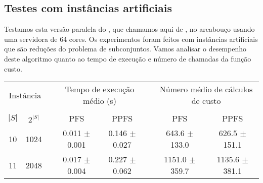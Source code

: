 \subsection{Testes com instâncias artificiais}
Testamos esta versão paralela do , que chamamos aqui de
, no arcabouço  usando uma servidora de
64 cores. Os experimentos foram feitos com instâncias artificiais que 
são reduções do problema de subconjuntos. Vamos analisar o desempenho 
deste algoritmo quanto ao tempo de execução e número de chamadas da 
função custo.

\begin{table}
\centering
\footnotesize
\begin{tabular}{cc c cc c cc}
\toprule
\multicolumn{2}{c}{Instância} & \phantom{} & \multicolumn{2}{c}{Tempo de execução médio (s)} & \phantom{} & \multicolumn{2}{c}{Número médio de cálculos de custo} \\
\cline{1-2}\cline{4-5}\cline{7-8}\\
$|S|$ & $2^{|S|}$ && PFS & PPFS && PFS & PPFS \\
10 &    1024 && 0.011 $\pm$ 0.001 & 0.146 $\pm$ 0.027 && 643.6 $\pm$ 133.0 & 626.5 $\pm$ 151.1 \\
11 &    2048 && 0.017 $\pm$ 0.004 & 0.227 $\pm$ 0.062 && 1151.0 $\pm$ 359.7 & 1135.6 $\pm$ 381.1 \\

\end{tabular}
\end{table}
